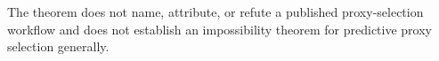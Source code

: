 The theorem does not name, attribute, or refute a published proxy-selection workflow and does not establish an impossibility theorem for predictive proxy selection generally.